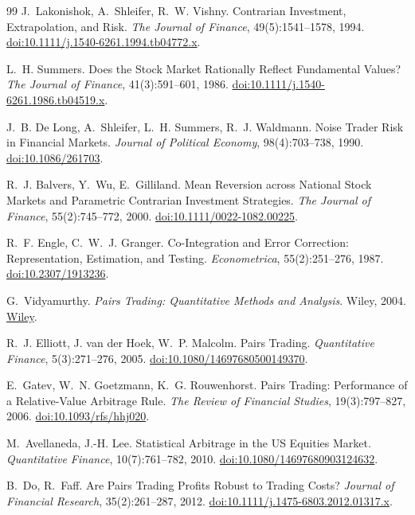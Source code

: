 \begin{thebibliography}{99}
 J.~Lakonishok, A.~Shleifer, R.~W. Vishny. Contrarian Investment, Extrapolation, and Risk. \emph{The Journal of Finance}, 49(5):1541--1578, 1994. \href{https://doi.org/10.1111/j.1540-6261.1994.tb04772.x}{doi:10.1111/j.1540-6261.1994.tb04772.x}.

 L.~H. Summers. Does the Stock Market Rationally Reflect Fundamental Values? \emph{The Journal of Finance}, 41(3):591--601, 1986. \href{https://doi.org/10.1111/j.1540-6261.1986.tb04519.x}{doi:10.1111/j.1540-6261.1986.tb04519.x}.

 J.~B. De Long, A.~Shleifer, L.~H. Summers, R.~J. Waldmann. Noise Trader Risk in Financial Markets. \emph{Journal of Political Economy}, 98(4):703--738, 1990. \href{https://doi.org/10.1086/261703}{doi:10.1086/261703}.

 R.~J. Balvers, Y.~Wu, E.~Gilliland. Mean Reversion across National Stock Markets and Parametric Contrarian Investment Strategies. \emph{The Journal of Finance}, 55(2):745--772, 2000. \href{https://doi.org/10.1111/0022-1082.00225}{doi:10.1111/0022-1082.00225}.

 R.~F. Engle, C.~W.~J. Granger. Co-Integration and Error Correction: Representation, Estimation, and Testing. \emph{Econometrica}, 55(2):251--276, 1987. \href{https://doi.org/10.2307/1913236}{doi:10.2307/1913236}.

 G.~Vidyamurthy. \emph{Pairs Trading: Quantitative Methods and Analysis}. Wiley, 2004. \href{https://www.wiley.com/en-us/Pairs+Trading%3A+Quantitative+Methods+and+Analysis-p-9780471460671}{Wiley}.

 R.~J. Elliott, J. van der Hoek, W.~P. Malcolm. Pairs Trading. \emph{Quantitative Finance}, 5(3):271--276, 2005. \href{https://doi.org/10.1080/14697680500149370}{doi:10.1080/14697680500149370}.

 E.~Gatev, W.~N. Goetzmann, K.~G. Rouwenhorst. Pairs Trading: Performance of a Relative-Value Arbitrage Rule. \emph{The Review of Financial Studies}, 19(3):797--827, 2006. \href{https://doi.org/10.1093/rfs/hhj020}{doi:10.1093/rfs/hhj020}.

 M.~Avellaneda, J.-H. Lee. Statistical Arbitrage in the US Equities Market. \emph{Quantitative Finance}, 10(7):761--782, 2010. \href{https://doi.org/10.1080/14697680903124632}{doi:10.1080/14697680903124632}.

 B.~Do, R.~Faff. Are Pairs Trading Profits Robust to Trading Costs? \emph{Journal of Financial Research}, 35(2):261--287, 2012. \href{https://doi.org/10.1111/j.1475-6803.2012.01317.x}{doi:10.1111/j.1475-6803.2012.01317.x}.


\end{thebibliography}
